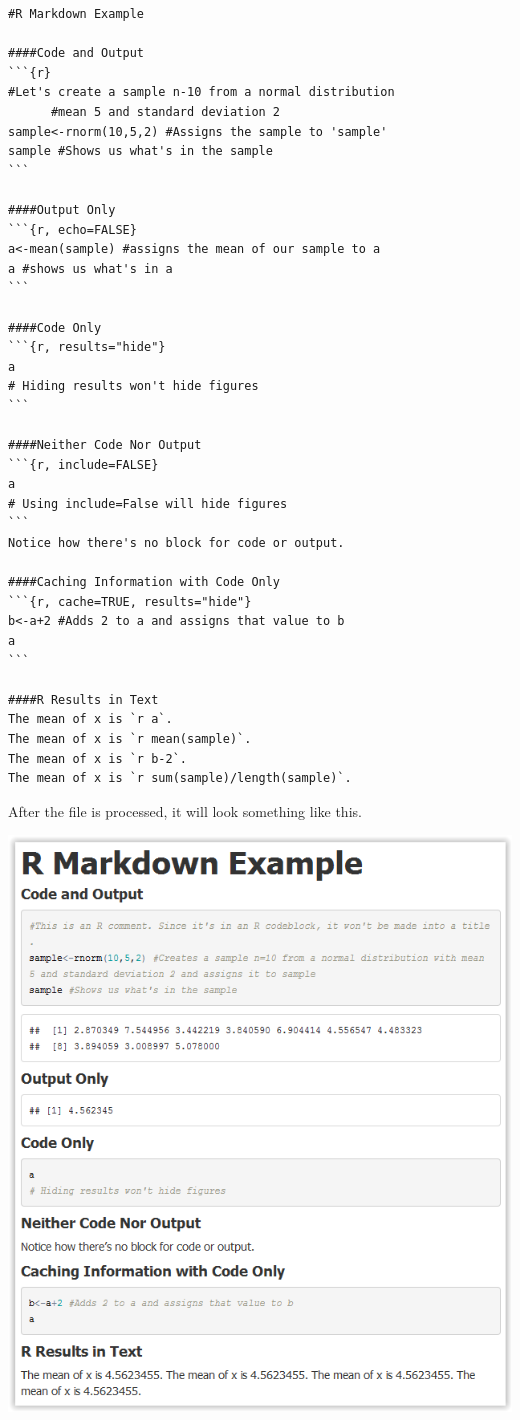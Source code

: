 \documentclass[12pt]{article}
\begin{document}
\begin{verbatim}
#R Markdown Example

####Code and Output
```{r}
#Let's create a sample n-10 from a normal distribution
      #mean 5 and standard deviation 2
sample<-rnorm(10,5,2) #Assigns the sample to 'sample'
sample #Shows us what's in the sample
```

####Output Only
```{r, echo=FALSE}
a<-mean(sample) #assigns the mean of our sample to a
a #shows us what's in a
```

####Code Only
```{r, results="hide"}
a
# Hiding results won't hide figures
```

####Neither Code Nor Output
```{r, include=FALSE}
a
# Using include=False will hide figures
```
Notice how there's no block for code or output.

####Caching Information with Code Only
```{r, cache=TRUE, results="hide"}
b<-a+2 #Adds 2 to a and assigns that value to b
a
```

####R Results in Text
The mean of x is `r a`.
The mean of x is `r mean(sample)`.
The mean of x is `r b-2`.
The mean of x is `r sum(sample)/length(sample)`.
\end{verbatim}

After the file is processed, it will look something like this.

\includegraphics{imgs/Rmd01.PNG}
\end{document}
